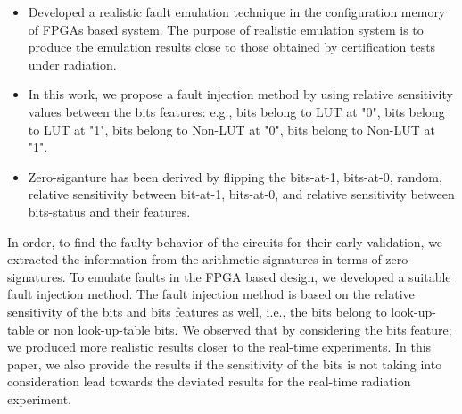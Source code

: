 \begin{itemize}



\item{Developed a realistic fault emulation technique in the configuration memory
of FPGAs based system. The purpose of realistic emulation system is to produce
the emulation results close to those obtained by certification tests under
radiation}.

\item{In this work, we propose a fault injection method by using relative sensitivity values between the bits features: e.g., bits belong to LUT at "0", bits belong to LUT at "1", bits belong to Non-LUT at "0", bits belong to Non-LUT at "1"}.

\item{Zero-siganture has been derived by flipping the bits-at-1, bits-at-0, random, relative sensitivity between bit-at-1, bits-at-0, and relative sensitivity between bits-status and their features}.
\end{itemize}


In order, to find the faulty behavior of the circuits for their early validation, we extracted the information from the arithmetic signatures in terms of zero-signatures. To emulate faults in the FPGA based design, we  developed a suitable fault injection method. The fault injection method is based on the relative sensitivity of the bits and bits features as well, i.e., the bits belong to look-up-table or non look-up-table bits. We observed that by considering the bits feature; we produced more realistic results closer to the real-time experiments. In this paper, we also provide the results if the sensitivity of the bits is not taking into consideration lead towards the deviated results for the real-time radiation experiment.


